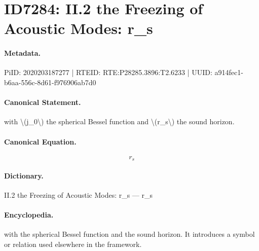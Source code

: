\section*{ID7284: II.2 the Freezing of Acoustic Modes: r\_s}
\paragraph{Metadata.}
PiID: 2020203187277 | RTEID: RTE:P28285.3896:T2.6233 | UUID: a914fec1-b6aa-556c-8d61-f976906ab7d0

\paragraph{Canonical Statement.}
with \textbackslash{}(j\_0\textbackslash{}) the spherical Bessel function and \textbackslash{}(r\_s\textbackslash{}) the sound horizon.

\paragraph{Canonical Equation.}
\[
r_s
\]

\paragraph{Dictionary.}
II.2 the Freezing of Acoustic Modes: r\_s — r\_s

\paragraph{Encyclopedia.}
with the spherical Bessel function and the sound horizon. It introduces a symbol or relation used elsewhere in the framework.
